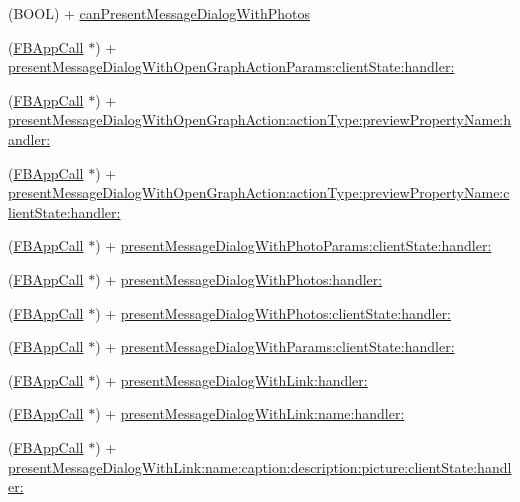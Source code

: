 \begin{DoxyCompactItemize}
(B\+O\+OL) + \hyperlink{interfaceFBDialogs_ac10e310c30d763c7885c11fb44ac4924}{can\+Present\+Message\+Dialog\+With\+Photos}
\item 
(\hyperlink{interfaceFBAppCall}{F\+B\+App\+Call} $\ast$) + \hyperlink{interfaceFBDialogs_a5bca1ea62e067e9bdb417526be737bb7}{present\+Message\+Dialog\+With\+Open\+Graph\+Action\+Params\+:client\+State\+:handler\+:}
\item 
(\hyperlink{interfaceFBAppCall}{F\+B\+App\+Call} $\ast$) + \hyperlink{interfaceFBDialogs_a0f030b33a0565ec590e4abe56e147dc0}{present\+Message\+Dialog\+With\+Open\+Graph\+Action\+:action\+Type\+:preview\+Property\+Name\+:handler\+:}
\item 
(\hyperlink{interfaceFBAppCall}{F\+B\+App\+Call} $\ast$) + \hyperlink{interfaceFBDialogs_abcc422b112c828ff673681fbf4d7ccc1}{present\+Message\+Dialog\+With\+Open\+Graph\+Action\+:action\+Type\+:preview\+Property\+Name\+:client\+State\+:handler\+:}
\item 
(\hyperlink{interfaceFBAppCall}{F\+B\+App\+Call} $\ast$) + \hyperlink{interfaceFBDialogs_a4354b3266eb59fa77f04d88a4e6cda32}{present\+Message\+Dialog\+With\+Photo\+Params\+:client\+State\+:handler\+:}
\item 
(\hyperlink{interfaceFBAppCall}{F\+B\+App\+Call} $\ast$) + \hyperlink{interfaceFBDialogs_a47a8fb26e758e8b8da4843ce641a3fe6}{present\+Message\+Dialog\+With\+Photos\+:handler\+:}
\item 
(\hyperlink{interfaceFBAppCall}{F\+B\+App\+Call} $\ast$) + \hyperlink{interfaceFBDialogs_aa349cd5cb466439073782e084c422ca0}{present\+Message\+Dialog\+With\+Photos\+:client\+State\+:handler\+:}
\item 
(\hyperlink{interfaceFBAppCall}{F\+B\+App\+Call} $\ast$) + \hyperlink{interfaceFBDialogs_a09310f22ebc3ece7c91ee5bb47ccc4c6}{present\+Message\+Dialog\+With\+Params\+:client\+State\+:handler\+:}
\item 
(\hyperlink{interfaceFBAppCall}{F\+B\+App\+Call} $\ast$) + \hyperlink{interfaceFBDialogs_a33517c3089b65e7ce4c64c1c22c4e4af}{present\+Message\+Dialog\+With\+Link\+:handler\+:}
\item 
(\hyperlink{interfaceFBAppCall}{F\+B\+App\+Call} $\ast$) + \hyperlink{interfaceFBDialogs_ab32ff5073473c59f8ced776e087d5fe4}{present\+Message\+Dialog\+With\+Link\+:name\+:handler\+:}
\item 
(\hyperlink{interfaceFBAppCall}{F\+B\+App\+Call} $\ast$) + \hyperlink{interfaceFBDialogs_a6441b5e4b196ed9b32180aa14400c05a}{present\+Message\+Dialog\+With\+Link\+:name\+:caption\+:description\+:picture\+:client\+State\+:handler\+:}
\end{DoxyCompactItemize}



